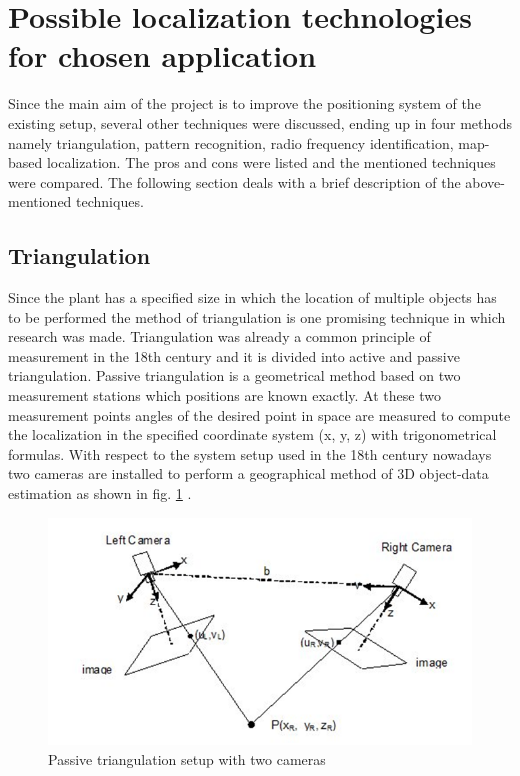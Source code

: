 \section{Possible localization technologies for chosen application} \label{Sec_selectionp}

Since the main aim of the project is to improve the positioning system of the existing setup, several other techniques were discussed, ending up in four methods namely triangulation, pattern recognition, radio frequency identification, map-based localization. The pros and cons were listed and the mentioned techniques were compared. The following section deals with a brief description of the above-mentioned techniques.\\

\subsection{Triangulation} %
Since the plant has a specified size in which the location of multiple objects has to be performed the method of triangulation is one promising technique in which research was made. 
Triangulation was already a common principle of measurement in the 18th century and it is divided into active and passive triangulation. Passive triangulation is a geometrical method based on two measurement stations which positions are known exactly. At these two measurement points angles of the desired point in space are measured to compute the localization in the specified coordinate system (x, y, z) with trigonometrical formulas.
With respect to the system setup used in the 18th century nowadays two cameras are installed to perform a geographical method of 3D object-data estimation as shown in fig. \ref{Triangulation} \cite{Prinzip3DVideometrie.}.
\begin{figure}[!htbp]
\begin{center}
\includegraphics[width = 16cm]{Pictures/Triangulation}
\caption[The ListOfFigures caption]{Passive triangulation setup with two cameras \footnotemark[1]}
\label{Triangulation}
\end{center}
\end{figure}
